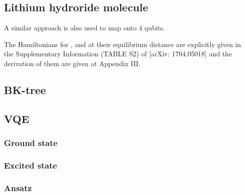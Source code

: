 \documentclass[11pt, oneside]{article}   	%
\begin{document}
\subsection{Lithium hydroride molecule}
A similar approach is also used to map  onto 4 qubits. 

The Hamiltonians for ,  and  at their equilibrium distance are explicitly given in the Supplementary Information (TABLE S2) of [arXiv: 1704.05018] and the derivation of them are given at Appendix III.

\subsection{BK-tree}

\subsection{VQE}
\subsubsection{Ground state}
\subsubsection{Excited state}
\subsubsection{Ansatz}
\end{document}
